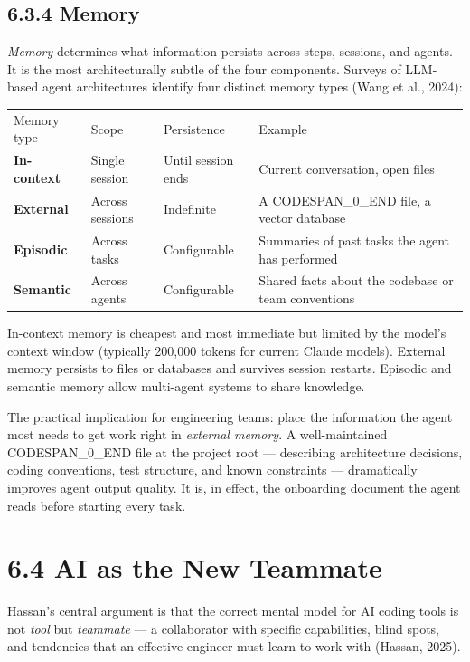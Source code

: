 \documentclass[11pt,a4paper]{book}
\begin{document}
\subsection{6.3.4 Memory}

\textit{Memory} determines what information persists across steps, sessions, and agents. It is the most architecturally subtle of the four components. Surveys of LLM-based agent architectures identify four distinct memory types (Wang et al., 2024):

\begin{tabular}{llll}
\hline
Memory type & Scope & Persistence & Example \\
\textbf{In-context} & Single session & Until session ends & Current conversation, open files \\
\textbf{External} & Across sessions & Indefinite & A CODESPAN\_0\_END file, a vector database \\
\textbf{Episodic} & Across tasks & Configurable & Summaries of past tasks the agent has performed \\
\textbf{Semantic} & Across agents & Configurable & Shared facts about the codebase or team conventions \\
\hline
\end{tabular}

In-context memory is cheapest and most immediate but limited by the model's context window (typically 200,000 tokens for current Claude models). External memory persists to files or databases and survives session restarts. Episodic and semantic memory allow multi-agent systems to share knowledge.

The practical implication for engineering teams: place the information the agent most needs to get work right in \textit{external memory}. A well-maintained CODESPAN\_0\_END file at the project root --- describing architecture decisions, coding conventions, test structure, and known constraints --- dramatically improves agent output quality. It is, in effect, the onboarding document the agent reads before starting every task.

\medskip

\section{6.4 AI as the New Teammate}

Hassan's central argument is that the correct mental model for AI coding tools is not \textit{tool} but \textit{teammate} --- a collaborator with specific capabilities, blind spots, and tendencies that an effective engineer must learn to work with (Hassan, 2025).
\end{document}
